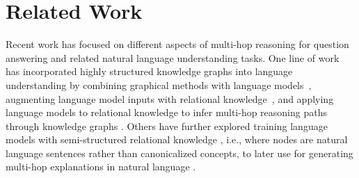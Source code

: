 \documentclass[letterpaper]{article} %
\begin{document}



\section{Related Work}


Recent work has focused on different aspects of multi-hop reasoning for question answering and related natural language understanding tasks. One line of work has incorporated highly structured knowledge graphs into language understanding by 
combining graphical methods with language models~\cite{lin-etal-2019-kagnet,ji-etal-2020-language,yasunaga-etal-2021-qa},
augmenting language model inputs with relational knowledge~\cite{zhang-etal-2019-ernie,chen-etal-2020-improving,xu-etal-2021-fusing},
and applying language models to relational knowledge to infer multi-hop reasoning paths through knowledge graphs \cite{wang-etal-2020-connecting}. Others have further explored training language models with semi-structured relational knowledge \cite{sap2019atomic,bosselut-etal-2019-comet,mostafazadeh-etal-2020-glucose,Hwang2020COMETATOMIC}, i.e., where nodes are natural language sentences rather than canonicalized concepts, to later use for generating multi-hop explanations in natural language \cite{shwartz-etal-2020-unsupervised,Bosselut2019DynamicKG}. 
\end{document}
